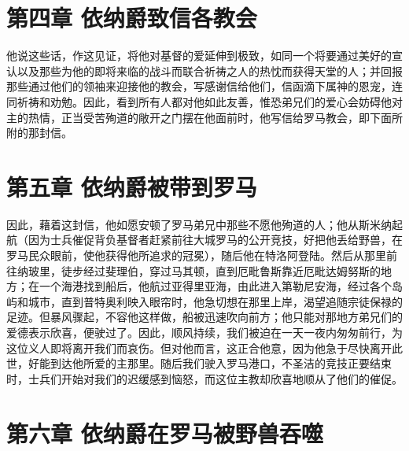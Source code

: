 
\section{第四章 依纳爵致信各教会}

他说这些话，作这见证，将他对基督的爱延伸到极致，如同一个将要通过美好的宣认以及那些为他的即将来临的战斗而联合祈祷之人的热忱而获得天堂的人；并回报那些通过他们的领袖来迎接他的教会，写感谢信给他们，信函滴下属神的恩宠，连同祈祷和劝勉。因此，看到所有人都对他如此友善，惟恐弟兄们的爱心会妨碍他对主的热情，正当受苦殉道的敞开之门摆在他面前时，他写信给罗马教会，即下面所附的那封信。\par


\section{第五章 依纳爵被带到罗马}

因此，藉着这封信，他如愿安顿了罗马弟兄中那些不愿他殉道的人；他从斯米纳起航（因为士兵催促背负基督者赶紧前往大城罗马的公开竞技，好把他丢给野兽，在罗马民众眼前，使他获得他所追求的冠冕），随后他在特洛阿登陆。然后从那里前往纳玻里，徒步经过斐理伯，穿过马其顿，直到厄毗鲁斯靠近厄毗达姆努斯的地方；在一个海港找到船后，他航过亚得里亚海，由此进入第勒尼安海，经过各个岛屿和城市，直到普特奥利映入眼帘时，他急切想在那里上岸，渴望追随宗徒保禄的足迹。但暴风骤起，不容他这样做，船被迅速吹向前方；他只能对那地方弟兄们的爱德表示欣喜，便驶过了。因此，顺风持续，我们被迫在一天一夜内匆匆前行，为这位义人即将离开我们而哀伤。但对他而言，这正合他意，因为他急于尽快离开此世，好能到达他所爱的主那里。随后我们驶入罗马港口，不圣洁的竞技正要结束时，士兵们开始对我们的迟缓感到恼怒，而这位主教却欣喜地顺从了他们的催促。\par


\section{第六章 依纳爵在罗马被野兽吞噬}

